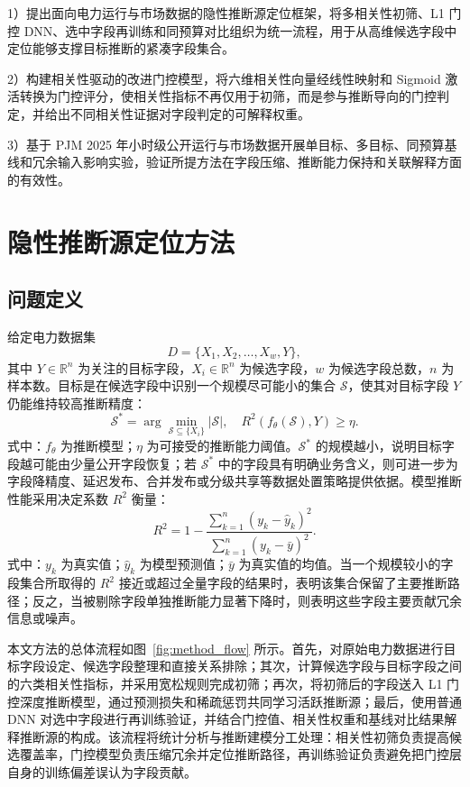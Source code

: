 \documentclass[UTF8,zihao=5,twoside]{ctexart}
\numberwithin{equation}{section}
\begin{document}
1）提出面向电力运行与市场数据的隐性推断源定位框架，将多相关性初筛、L1 门控 DNN、选中字段再训练和同预算对比组织为统一流程，用于从高维候选字段中定位能够支撑目标推断的紧凑字段集合。

2）构建相关性驱动的改进门控模型，将六维相关性向量经线性映射和 Sigmoid 激活转换为门控评分，使相关性指标不再仅用于初筛，而是参与推断导向的门控判定，并给出不同相关性证据对字段判定的可解释权重。

3）基于 PJM 2025 年小时级公开运行与市场数据开展单目标、多目标、同预算基线和冗余输入影响实验，验证所提方法在字段压缩、推断能力保持和关联解释方面的有效性。

\section{隐性推断源定位方法}
\subsection{问题定义}
给定电力数据集
\begin{equation}
D=\{X_1,X_2,\ldots,X_w,Y\},
\end{equation}
其中 $Y\in\mathbb{R}^{n}$ 为关注的目标字段，$X_i\in\mathbb{R}^{n}$ 为候选字段，$w$ 为候选字段总数，$n$ 为样本数。目标是在候选字段中识别一个规模尽可能小的集合 $\mathcal{S}$，使其对目标字段 $Y$ 仍能维持较高推断精度：
\begin{equation}
\mathcal{S}^{*}=\arg\min_{\mathcal{S}\subseteq \{X_i\}}\left|\mathcal{S}\right|,
\quad
R^2(f_{\theta}(\mathcal{S}),Y)\geq \eta .
\end{equation}
式中：$f_{\theta}$ 为推断模型；$\eta$ 为可接受的推断能力阈值。$\mathcal{S}^{*}$ 的规模越小，说明目标字段越可能由少量公开字段恢复；若 $\mathcal{S}^{*}$ 中的字段具有明确业务含义，则可进一步为字段降精度、延迟发布、合并发布或分级共享等数据处置策略提供依据。模型推断性能采用决定系数 $R^2$ 衡量：
\begin{equation}
R^2=1-\frac{\sum_{k=1}^{n}(y_k-\hat{y}_k)^2}{\sum_{k=1}^{n}(y_k-\bar{y})^2}.
\end{equation}
式中：$y_k$ 为真实值；$\hat{y}_k$ 为模型预测值；$\bar{y}$ 为真实值的均值。当一个规模较小的字段集合所取得的 $R^2$ 接近或超过全量字段的结果时，表明该集合保留了主要推断路径；反之，当被剔除字段单独推断能力显著下降时，则表明这些字段主要贡献冗余信息或噪声。

本文方法的总体流程如图~\ref{fig:method_flow} 所示。首先，对原始电力数据进行目标字段设定、候选字段整理和直接关系排除；其次，计算候选字段与目标字段之间的六类相关性指标，并采用宽松规则完成初筛；再次，将初筛后的字段送入 L1 门控深度推断模型，通过预测损失和稀疏惩罚共同学习活跃推断源；最后，使用普通 DNN 对选中字段进行再训练验证，并结合门控值、相关性权重和基线对比结果解释推断源的构成。该流程将统计分析与推断建模分工处理：相关性初筛负责提高候选覆盖率，门控模型负责压缩冗余并定位推断路径，再训练验证负责避免把门控层自身的训练偏差误认为字段贡献。
\end{document}
